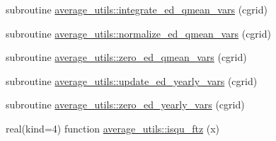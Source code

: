 \begin{DoxyCompactItemize}
\item 
subroutine \hyperlink{namespaceaverage__utils_af429d166f6097c18d6ab4ce05adbd31f}{average\+\_\+utils\+::integrate\+\_\+ed\+\_\+qmean\+\_\+vars} (cgrid)
\item 
subroutine \hyperlink{namespaceaverage__utils_ad7f232f9a24079c3430b005098729615}{average\+\_\+utils\+::normalize\+\_\+ed\+\_\+qmean\+\_\+vars} (cgrid)
\item 
subroutine \hyperlink{namespaceaverage__utils_a2e9cb2592327099345c147516b927f51}{average\+\_\+utils\+::zero\+\_\+ed\+\_\+qmean\+\_\+vars} (cgrid)
\item 
subroutine \hyperlink{namespaceaverage__utils_a81384775dd05dba144bf83e9731d5275}{average\+\_\+utils\+::update\+\_\+ed\+\_\+yearly\+\_\+vars} (cgrid)
\item 
subroutine \hyperlink{namespaceaverage__utils_a81df7cc84b1d62f7fb950e91d410abbd}{average\+\_\+utils\+::zero\+\_\+ed\+\_\+yearly\+\_\+vars} (cgrid)
\item 
real(kind=4) function \hyperlink{namespaceaverage__utils_ac90817fe39c27153ed7bbee2cb856611}{average\+\_\+utils\+::isqu\+\_\+ftz} (x)
\end{DoxyCompactItemize}
